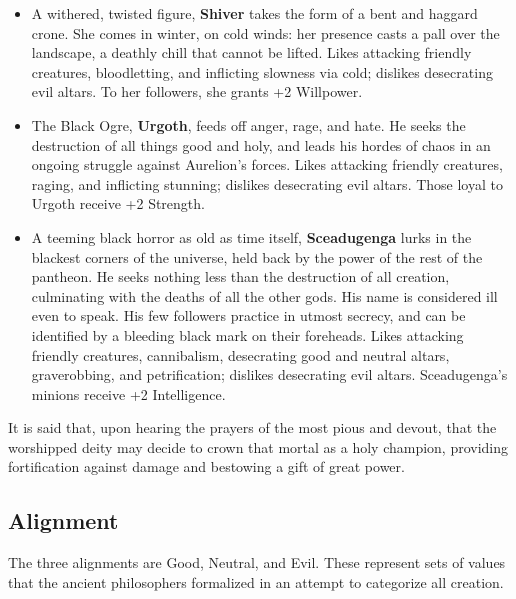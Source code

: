 \begin{itemize}
\item A withered, twisted figure, {\bf Shiver} takes the form of a bent and
haggard crone.  She comes in winter, on cold winds: her presence casts a 
pall over the landscape, a deathly chill that cannot be lifted.  Likes attacking
friendly creatures, bloodletting, and inflicting slowness via cold; dislikes
desecrating evil altars.  To her followers, she grants +2 Willpower. 

\item The Black Ogre, {\bf Urgoth}, feeds off anger, rage, and hate.  He 
seeks the destruction of all things good and holy, and leads his hordes of 
chaos in an ongoing struggle against Aurelion's forces.  Likes attacking
friendly creatures, raging, and inflicting stunning; dislikes desecrating
evil altars.  Those loyal to Urgoth receive +2 Strength.

\item A teeming black horror as old as time itself, {\bf Sceadugenga} lurks
in the blackest corners of the universe, held back by the power of the rest
of the pantheon.  He seeks nothing less than the destruction of all 
creation, culminating with the deaths of all the other gods.  His name is 
considered ill even to speak.  His few followers practice in utmost 
secrecy, and can be identified by a bleeding black mark on their 
foreheads.  Likes attacking friendly creatures, cannibalism, desecrating good
and neutral altars, graverobbing, and petrification; dislikes desecrating evil
altars.  Sceadugenga's minions receive +2 Intelligence.

\end{itemize}

It is said that, upon hearing the prayers of the most pious and devout,
that the worshipped deity may decide to crown that mortal as a holy
champion, providing fortification against damage and bestowing a gift
of great power.

\subsection{Alignment}

The three alignments are Good, Neutral, and Evil.  These represent sets
of values that the ancient philosophers formalized in an attempt to
categorize all creation.

